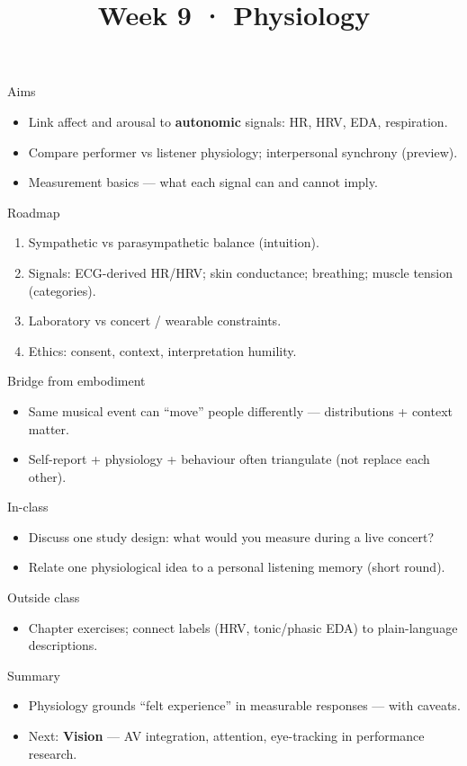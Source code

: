 \documentclass[aspectratio=169]{beamer}
\title{Week 9 · Physiology}
\subtitle{\coursename}
\institute{\instituteuo}
\date{}
\begin{document}
\begin{frame}
  \titlepage
\end{frame}

\begin{frame}{Aims}
  \begin{itemize}
    \item Link affect and arousal to \textbf{autonomic} signals: HR, HRV, EDA, respiration.
    \item Compare performer vs listener physiology; interpersonal synchrony (preview).
    \item Measurement basics — what each signal can and cannot imply.
  \end{itemize}
\end{frame}

\begin{frame}{Roadmap}
  \begin{enumerate}
    \item Sympathetic vs parasympathetic balance (intuition).
    \item Signals: ECG-derived HR/HRV; skin conductance; breathing; muscle tension (categories).
    \item Laboratory vs concert / wearable constraints.
    \item Ethics: consent, context, interpretation humility.
  \end{enumerate}
\end{frame}

\begin{frame}{Bridge from embodiment}
  \begin{itemize}
    \item Same musical event can ``move'' people differently — distributions + context matter.
    \item Self-report + physiology + behaviour often triangulate (not replace each other).
  \end{itemize}
\end{frame}

\begin{frame}{In-class}
  \begin{itemize}
    \item Discuss one study design: what would you measure during a live concert?
    \item Relate one physiological idea to a personal listening memory (short round).
  \end{itemize}
\end{frame}

\begin{frame}{Outside class}
  \begin{itemize}
    \item Chapter exercises; connect labels (HRV, tonic/phasic EDA) to plain-language descriptions.
  \end{itemize}
\end{frame}

\begin{frame}{Summary}
  \begin{itemize}
    \item Physiology grounds ``felt experience'' in measurable responses — with caveats.
    \item Next: \textbf{Vision} — AV integration, attention, eye-tracking in performance research.
  \end{itemize}
\end{frame}
\end{document}
